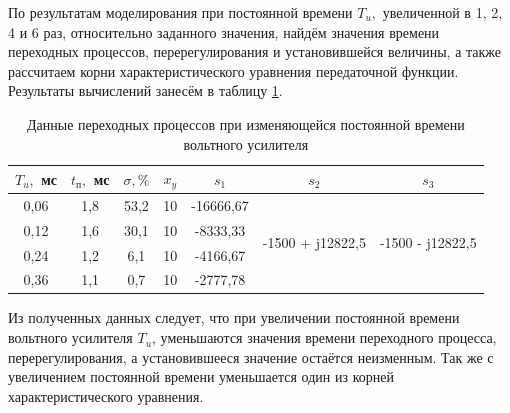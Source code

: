 \documentclass[fleqn, a4paper, 11pt, russian]{article}
\begin{document}
	\newpage
	По результатам моделирования при постоянной времени $T_u,$ увеличенной в 1, 2, 4 и 6 раз, относительно заданного значения, найдём значения времени переходных процессов, перерегулирования и установившейся величины, а также рассчитаем корни характеристического уравнения передаточной функции. Результаты вычислений занесём в таблицу \ref{tvarTab}.
	\begin{table}[ht!]
		\caption{Данные переходных процессов при изменяющейся постоянной времени вольтного усилителя}
		\begin{tabular}{|c|c|c|c|c|c|c|}
			\hline
			$T_u,$ мс	& $t_\text{п},$ мс	& $\sigma, \%$	& $x_y$	& $s_1$		& $s_2$								& $s_3$								\\\hline
			0,06		& 1,8				& 53,2			& 10	& -16666,67	& \multirow{4}{*}{-1500 + j12822,5}	& \multirow{4}{*}{-1500 - j12822,5} \\\cline{1-5}
			0,12		& 1,6				& 30,1			& 10	& -8333,33	&	& 	\\\cline{1-5}
			0,24		& 1,2				& 6,1			& 10	& -4166,67	& 	&	\\\cline{1-5}
			0,36		& 1,1				& 0,7			& 10	& -2777,78	&	&	\\
			\hline
		\end{tabular}
		\label{tvarTab}
	\end{table}
	
	Из полученных данных следует, что при увеличении постоянной времени вольтного усилителя $T_u$, уменьшаются значения времени переходного процесса, перерегулирования, а установившееся значение остаётся неизменным. Так же с увеличением постоянной времени уменьшается один из корней характеристического уравнения.
	\clearpage
\end{document}
